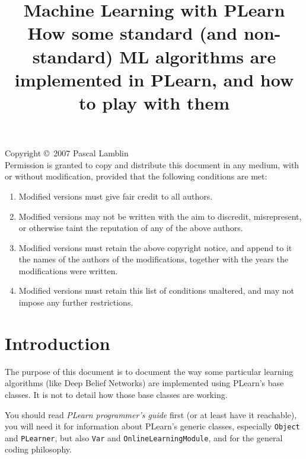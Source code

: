 \documentclass[11pt]{book}
\title{\Huge Machine Learning with PLearn\\
\Large How some standard (and non-standard) ML algorithms are
implemented in PLearn, and how to play with them}
\begin{document}
\thispagestyle{empty}

\maketitle

\pagebreak

\vspace*{10cm}



Copyright \copyright\ 2007 Pascal Lamblin \\

Permission is granted to copy and distribute this document in any medium,
with or without modification, provided that the following conditions are
met:

\begin{enumerate}
\item Modified versions must give fair credit to all authors.
\item Modified versions may not be written with the aim to discredit, misrepresent, or otherwise taint the
    reputation of any of the above authors.
\item Modified versions must retain the above copyright notice, and append to
    it the names of the authors of the modifications, together with the years the
    modifications were written.
\item Modified versions must retain this list of conditions unaltered,
    and may not impose any further restrictions.
\end{enumerate}


\pagebreak

\tableofcontents

\cleardoublepage\pagebreak
{}


\chapter*{Introduction}

The purpose of this document is to document the way some particular
learning algorithms (like Deep Belief Networks) are implemented using
PLearn's base classes. It is not to detail how those base classes are
working.

You should read {\it PLearn programmer's guide} first (or at least have
it reachable), you will need it for information about PLearn's generic
classes, especially {\tt Object} and {\tt PLearner}, but also {\tt Var}
and {\tt OnlineLearningModule}, and for the general coding philosophy.
\end{document}
